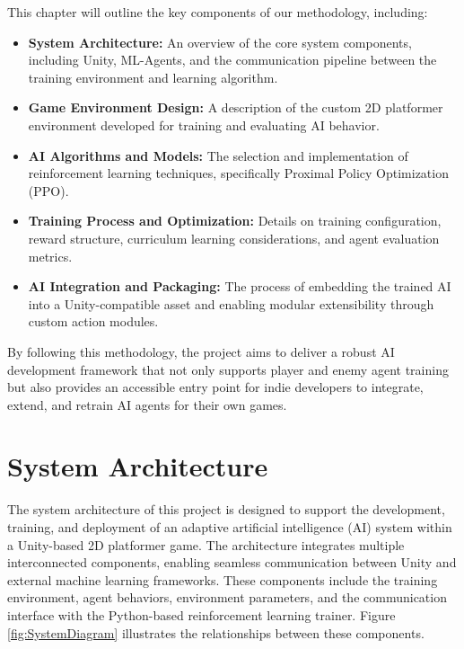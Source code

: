 \documentclass[12pt,oneside,openright,a4paper]{cpe-english-project}
\begin{document}
This chapter will outline the key components of our methodology, including:
\begin{itemize}
\item \textbf{System Architecture:} An overview of the core system components, including Unity, ML-Agents, and the communication pipeline between the training environment and learning algorithm.
\item \textbf{Game Environment Design:} A description of the custom 2D platformer environment developed for training and evaluating AI behavior.
\item \textbf{AI Algorithms and Models:} The selection and implementation of reinforcement learning techniques, specifically Proximal Policy Optimization (PPO).
\item \textbf{Training Process and Optimization:} Details on training configuration, reward structure, curriculum learning considerations, and agent evaluation metrics.
\item \textbf{AI Integration and Packaging:} The process of embedding the trained AI into a Unity-compatible asset and enabling modular extensibility through custom action modules.
\end{itemize}

By following this methodology, the project aims to deliver a robust AI development framework that not only supports player and enemy agent training but also provides an accessible entry point for indie developers to integrate, extend, and retrain AI agents for their own games.\par

\section{System Architecture}

The system architecture of this project is designed to support the development, training, and deployment of an adaptive artificial intelligence (AI) system within a Unity-based 2D platformer game. The architecture integrates multiple interconnected components, enabling seamless communication between Unity and external machine learning frameworks. These components include the training environment, agent behaviors, environment parameters, and the communication interface with the Python-based reinforcement learning trainer. Figure \ref{fig:SystemDiagram} illustrates the relationships between these components.\par
\end{document}
